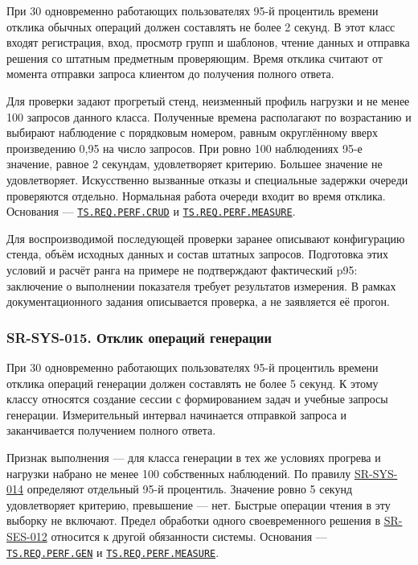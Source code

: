 \documentclass[12pt,a4paper]{article}
\begin{document}
При 30 одновременно работающих пользователях 95-й процентиль времени отклика обычных операций должен составлять не более 2 секунд. В этот класс входят регистрация, вход, просмотр групп и шаблонов, чтение данных и отправка решения со штатным предметным проверяющим. Время отклика считают от момента отправки запроса клиентом до получения полного ответа.

Для проверки задают прогретый стенд, неизменный профиль нагрузки и не менее 100 запросов данного класса. Полученные времена располагают по возрастанию и выбирают наблюдение с порядковым номером, равным округлённому вверх произведению 0,95 на число запросов. При ровно 100 наблюдениях 95-е значение, равное 2 секундам, удовлетворяет критерию. Большее значение не удовлетворяет. Искусственно вызванные отказы и специальные задержки очереди проверяются отдельно. Нормальная работа очереди входит во время отклика. Основания --- {\href{../02\_Техническое\_задание/Техническое\_задание.pdf\#ts-req-perf-crud}{\texttt{TS.\allowbreak{}REQ.\allowbreak{}PERF.\allowbreak{}CRUD}}} и {\href{../02\_Техническое\_задание/Техническое\_задание.pdf\#ts-req-perf-measure}{\texttt{TS.\allowbreak{}REQ.\allowbreak{}PERF.\allowbreak{}MEASURE}}}.

Для воспроизводимой последующей проверки заранее описывают конфигурацию стенда, объём исходных данных и состав штатных запросов. Подготовка этих условий и расчёт ранга на примере не подтверждают фактический p95: заключение о выполнении показателя требует результатов измерения. В рамках документационного задания описывается проверка, а не заявляется её прогон.

\subsubsection{SR-SYS-015. Отклик операций генерации}\label{sr-sys-015-ux43eux442ux43aux43bux438ux43a-ux43eux43fux435ux440ux430ux446ux438ux439-ux433ux435ux43dux435ux440ux430ux446ux438ux438}

\hypertarget{sr-sys-015-отклик-операций-генерации}{}

\hypertarget{sr-sys-015}{}

При 30 одновременно работающих пользователях 95-й процентиль времени отклика операций генерации должен составлять не более 5 секунд. К этому классу относятся создание сессии с формированием задач и учебные запросы генерации. Измерительный интервал начинается отправкой запроса и заканчивается получением полного ответа.

Признак выполнения --- для класса генерации в тех же условиях прогрева и нагрузки набрано не менее 100 собственных наблюдений. По правилу {\hyperlink{sr-sys-014}{SR-SYS-014}} определяют отдельный 95-й процентиль. Значение ровно 5 секунд удовлетворяет критерию, превышение --- нет. Быстрые операции чтения в эту выборку не включают. Предел обработки одного своевременного решения в {\hyperlink{sr-ses-012}{SR-SES-012}} относится к другой обязанности системы. Основания --- {\href{../02\_Техническое\_задание/Техническое\_задание.pdf\#ts-req-perf-gen}{\texttt{TS.\allowbreak{}REQ.\allowbreak{}PERF.\allowbreak{}GEN}}} и {\href{../02\_Техническое\_задание/Техническое\_задание.pdf\#ts-req-perf-measure}{\texttt{TS.\allowbreak{}REQ.\allowbreak{}PERF.\allowbreak{}MEASURE}}}.
\end{document}

